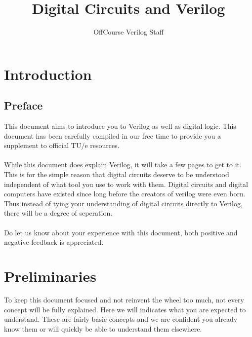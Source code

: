 \documentclass[12pt, a4paper, oneside]{memoir}
\author{OffCourse Verilog Staff}
\title{\textbf{Digital Circuits and Verilog}}
\begin{document}
\setlength{\beforechapskip}{-20pt}



\maketitle
\thispagestyle{empty}

\chapter*{Introduction}
\section*{Preface}
This document aims to introduce you to Verilog as well as digital logic.
This document has been carefully compiled in our free time to provide you a supplement to official TU/e resources.
\\\\
While this document does explain Verilog, it will take a few pages to get to it.
This is for the simple reason that digital circuits deserve to be understood independent of what tool you use to work with them.
Digital circuits and digital computers have existed since long before the creators of verilog were even born.
Thus instead of tying your understanding of digital circuits directly to Verilog, there will be a degree of seperation.
\\\\
Do let us know about your experience with this document, both positive and negative feedback is appreciated.

\chapter*{Preliminaries}
To keep this document focused and not reinvent the wheel too much, not every concept will be fully explained.
Here we will indicates what you are expected to understand.
These are fairly basic concepts and we are confident you already know them or will quickly be able to understand them elsewhere.
\end{document}
